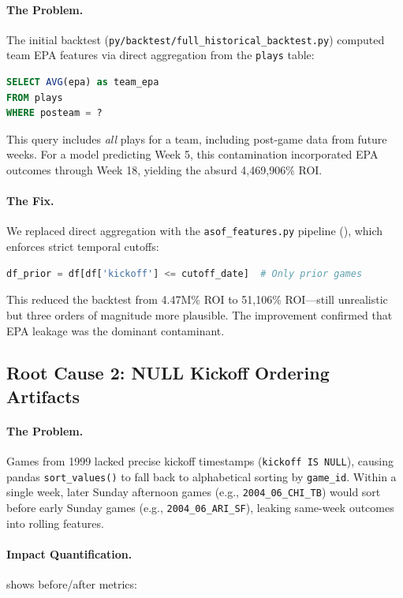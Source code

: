 \paragraph{The Problem.}
The initial backtest (\texttt{py/backtest/full\_historical\_backtest.py}) computed team EPA features via direct aggregation from the \texttt{plays} table:
\begin{lstlisting}[language=SQL,basicstyle=\ttfamily\scriptsize]
SELECT AVG(epa) as team_epa
FROM plays
WHERE posteam = ?
\end{lstlisting}

This query includes \emph{all} plays for a team, including post-game data from future weeks. For a model predicting Week 5, this contamination incorporated EPA outcomes through Week 18, yielding the absurd 4,469,906\% ROI.

\paragraph{The Fix.}
We replaced direct aggregation with the \texttt{asof\_features.py} pipeline (), which enforces strict temporal cutoffs:
\begin{lstlisting}[language=Python,basicstyle=\ttfamily\scriptsize]
df_prior = df[df['kickoff'] <= cutoff_date]  # Only prior games
\end{lstlisting}

This reduced the backtest from 4.47M\% ROI to 51,106\% ROI---still unrealistic but three orders of magnitude more plausible. The improvement confirmed that EPA leakage was the dominant contaminant.

\subsection{Root Cause 2: NULL Kickoff Ordering Artifacts}

\paragraph{The Problem.}
Games from 1999 lacked precise kickoff timestamps (\texttt{kickoff IS NULL}), causing pandas \texttt{sort\_values()} to fall back to alphabetical sorting by \texttt{game\_id}. Within a single week, later Sunday afternoon games (e.g., \texttt{2004\_06\_CHI\_TB}) would sort before early Sunday games (e.g., \texttt{2004\_06\_ARI\_SF}), leaking same-week outcomes into rolling features.

\paragraph{Impact Quantification.}
 shows before/after metrics:

